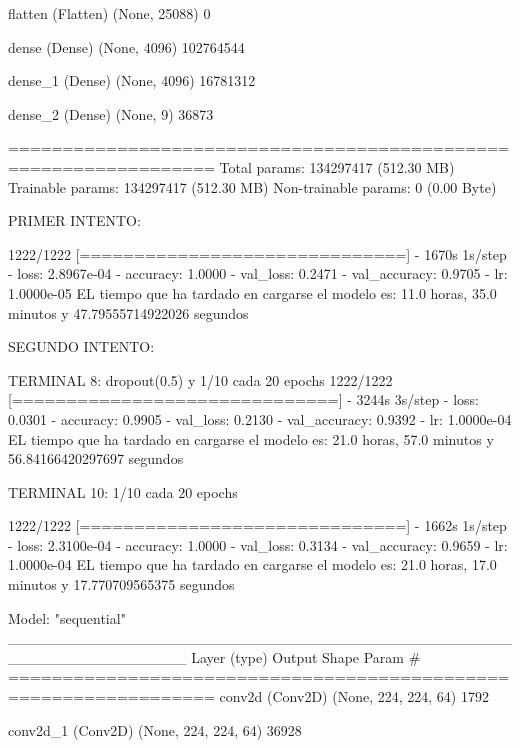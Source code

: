 \documentclass[11pt, a4paper]{article} %
\begin{document}
 flatten (Flatten)           (None, 25088)             0         
                                                                 
 dense (Dense)               (None, 4096)              102764544 
                                                                 
 dense_1 (Dense)             (None, 4096)              16781312  
                                                                 
 dense_2 (Dense)             (None, 9)                 36873     
                                                                 
=================================================================
Total params: 134297417 (512.30 MB)
Trainable params: 134297417 (512.30 MB)
Non-trainable params: 0 (0.00 Byte)

PRIMER INTENTO:

1222/1222 [==============================] - 1670s 1s/step - loss: 2.8967e-04 - accuracy: 1.0000 - val_loss: 0.2471 - val_accuracy: 0.9705 - lr: 1.0000e-05
EL tiempo que ha tardado en cargarse el modelo es: 11.0 horas, 35.0 minutos y 47.79555714922026 segundos 

SEGUNDO INTENTO:





TERMINAL 8: dropout(0.5) y 1/10 cada 20 epochs
1222/1222 [==============================] - 3244s 3s/step - loss: 0.0301 - accuracy: 0.9905 - val_loss: 0.2130 - val_accuracy: 0.9392 - lr: 1.0000e-04
EL tiempo que ha tardado en cargarse el modelo es: 21.0 horas, 57.0 minutos y 56.84166420297697 segundos


TERMINAL 10: 1/10 cada 20 epochs

1222/1222 [==============================] - 1662s 1s/step - loss: 2.3100e-04 - accuracy: 1.0000 - val_loss: 0.3134 - val_accuracy: 0.9659 - lr: 1.0000e-04
EL tiempo que ha tardado en cargarse el modelo es: 21.0 horas, 17.0 minutos y 17.770709565375 segundos

Model: "sequential"
_________________________________________________________________
 Layer (type)                Output Shape              Param #   
=================================================================
 conv2d (Conv2D)             (None, 224, 224, 64)      1792      
                                                                 
 conv2d_1 (Conv2D)           (None, 224, 224, 64)      36928     
                                                                 
\end{document}
